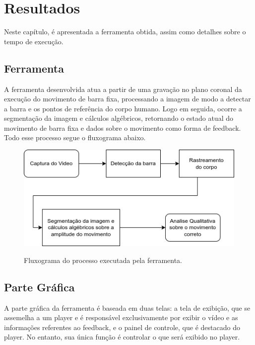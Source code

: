 \chapter{Resultados}

Neste capítulo, é apresentada a ferramenta obtida, assim como detalhes sobre o tempo de execução.

\section[Ferramenta]{Ferramenta}

A ferramenta desenvolvida atua a partir de uma gravação no plano coronal da execução do movimento de barra fixa, processando a imagem de modo a detectar a barra e os pontos de referência do corpo humano. Logo em seguida, ocorre a segmentação da imagem e cálculos algébricos, retornando o estado atual do movimento de barra fixa e dados sobre o movimento como forma de feedback. Todo esse processo segue o fluxograma abaixo.

\begin{figure}[!htb]
	\centering
  \caption{Fluxograma do processo executada pela ferramenta.}
	\includegraphics[scale=0.7]{figuras/diagrama/processo.png}
	\label{fig:fluxo}
\end{figure}


\section[Parte Gráfica]{Parte Gráfica}

A parte gráfica da ferramenta é baseada em duas telas: a tela de exibição, que se assemelha a um player e é responsável exclusivamente por exibir o vídeo e as informações referentes ao feedback, e o painel de controle, que é destacado do player. No entanto, sua única função é controlar o que será exibido no player.

